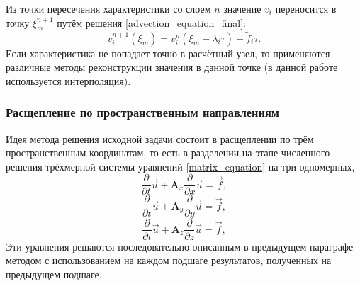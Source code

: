 Из точки пересечения характеристики со слоем $n$ значение $v_i$ переносится в 
точку $\xi^{n+1}_m$ путём решения \ref{advection_equation_final}:
$$v_i^{n+1}(\xi_m)=v^{n}_i(\xi_m-\lambda_i\tau) + {\tilde f}_i \tau.$$
Если характеристика не попадает точно в расчётный узел, то применяются различные
методы реконструкции значения в данной точке (в данной работе используется
интерполяция).
\subsubsection{Расщепление по пространственным направлениям}				
Идея метода \cite{fedorenko} решения исходной задачи состоит в расщеплении по трём пространственным координатам, то есть в разделении на этапе численного решения трёхмерной системы уравнений \ref{matrix_equation} на три одномерных,
\begin{equation}
\frac{\partial}{\partial t}\vec u+\mathbf{A}_x \frac{\partial}{\partial x}\vec u
= \vec f,
\label{matrix_equation_x}
\end{equation}
\begin{equation}
\frac{\partial}{\partial t}\vec u+\mathbf{A}_y \frac{\partial}{\partial y}\vec u
= \vec f,
\label{matrix_equation_y}
\end{equation}
\begin{equation}
\frac{\partial}{\partial t}\vec u+\mathbf{A}_z \frac{\partial}{\partial z}\vec u
= \vec f,
\label{matrix_equation_z}
\end{equation}
Эти уравнения решаются последовательно описанным в предыдущем параграфе методом с использованием
на каждом подшаге результатов, полученных на предыдущем подшаге.
